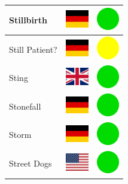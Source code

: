\documentclass[12pt, a4paper, twoside]{report}
\begin{document}
\begin{center}
\begin{longtable}{|p{5cm}|p{2cm}|p{2cm}|}
 Stillbirth                                                 & \includegraphics[width=1cm]{../img/flags/de} &   \includegraphics[width=1cm]{../likes/y} \\ \hline
 Still Patient?                                             & \includegraphics[width=1cm]{../img/flags/de} &   \includegraphics[width=1cm]{../likes/m} \\ \hline
 Sting                                                      & \includegraphics[width=1cm]{../img/flags/gb} &   \includegraphics[width=1cm]{../likes/y} \\ \hline
 Stonefall                                                  & \includegraphics[width=1cm]{../img/flags/de} &   \includegraphics[width=1cm]{../likes/y} \\ \hline
 Storm                                                      & \includegraphics[width=1cm]{../img/flags/de} &   \includegraphics[width=1cm]{../likes/y} \\ \hline
 Street Dogs                                                & \includegraphics[width=1cm]{../img/flags/us} &   \includegraphics[width=1cm]{../likes/y} \\ \hline

\end{longtable}
\end{center}
\end{document}
